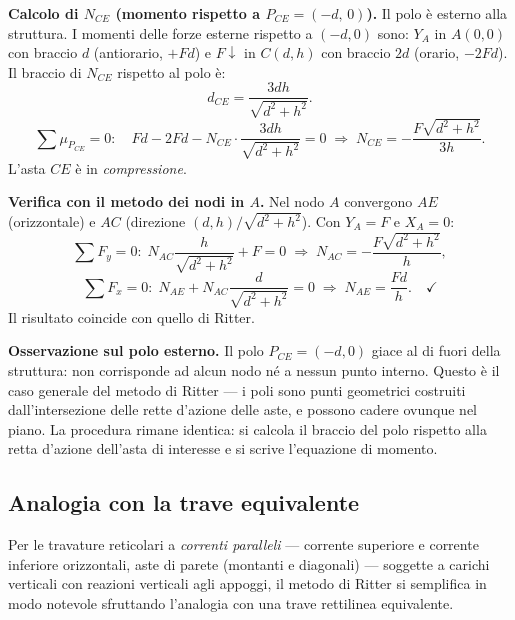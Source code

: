 \begin{esempio}
\begin{svolgimento}
		\noindent\textbf{Calcolo di $N_{CE}$
			(momento rispetto a $P_{CE} = (-d,\,0)$).}
		Il polo è esterno alla struttura. I momenti delle
		forze esterne rispetto a $(-d,0)$ sono: $Y_A$ in
		$A(0,0)$ con braccio $d$ (antiorario, $+Fd$) e
		$F\downarrow$ in $C(d,h)$ con braccio $2d$
		(orario, $-2Fd$). Il braccio di $N_{CE}$ rispetto
		al polo è:
		\[
		d_{CE} = \frac{3dh}{\sqrt{d^2+h^2}}.
		\]
		\[
		\sum \mu_{P_{CE}} = 0:\quad
		Fd - 2Fd
		- N_{CE} \cdot \frac{3dh}{\sqrt{d^2+h^2}}
		= 0
		\;\Rightarrow\;
		N_{CE} = -\frac{F\sqrt{d^2+h^2}}{3h}.
		\]
		L'asta $CE$ è in \emph{compressione}.
		
		\noindent\textbf{Verifica con il metodo dei nodi
			in $A$.}
		Nel nodo $A$ convergono $AE$ (orizzontale) e $AC$
		(direzione $(d,h)/\sqrt{d^2+h^2}$). Con $Y_A=F$
		e $X_A=0$:
		\[
		\sum F_y = 0:\;
		N_{AC}\frac{h}{\sqrt{d^2+h^2}} + F = 0
		\;\Rightarrow\;
		N_{AC} = -\frac{F\sqrt{d^2+h^2}}{h},
		\]
		\[
		\sum F_x = 0:\;
		N_{AE} + N_{AC}\frac{d}{\sqrt{d^2+h^2}} = 0
		\;\Rightarrow\;
		N_{AE} = \frac{Fd}{h}. \quad\checkmark
		\]
		Il risultato coincide con quello di Ritter.
		
		\noindent\textbf{Osservazione sul polo esterno.}
		Il polo $P_{CE} = (-d,0)$ giace al di fuori della
		struttura: non corrisponde ad alcun nodo né a
		nessun punto interno. Questo è il caso generale
		del metodo di Ritter --- i poli sono punti
		geometrici costruiti dall'intersezione delle rette
		d'azione delle aste, e possono cadere ovunque nel
		piano. La procedura rimane identica: si calcola
		il braccio del polo rispetto alla retta d'azione
		dell'asta di interesse e si scrive l'equazione di
		momento.
	\end{svolgimento}
\end{esempio}

\subsection{Analogia con la trave equivalente}
\label{sec:trave_equivalente}

Per le travature reticolari a \emph{correnti paralleli}
--- corrente superiore e corrente inferiore orizzontali,
aste di parete (montanti e diagonali) --- soggette a
carichi verticali con reazioni verticali agli appoggi,
il metodo di Ritter si semplifica in modo notevole
sfruttando l'analogia con una trave rettilinea
equivalente.

